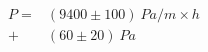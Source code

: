 \begin{equation}
\begin{split}
P = 
&(9400\pm 100)\ \si{Pa/m} \times h
\\ + &(60\pm 20)\ \si{Pa}
\end{split}
\end{equation}
